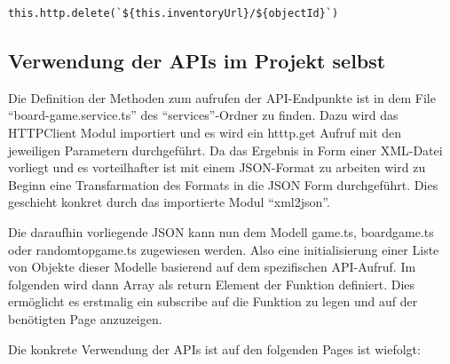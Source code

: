 \begin{center}
    \begin{lstlisting}[caption={Löschaufruf der MongoDB API}, label=lst:jscode]
    this.http.delete(`${this.inventoryUrl}/${objectId}`)
\end{lstlisting}
\end{center}


\subsection{Verwendung der APIs im Projekt selbst}

Die Definition der Methoden zum aufrufen der API-Endpunkte ist in dem   File ``board-game.service.ts'' des ``services''-Ordner zu finden.
Dazu wird das HTTPClient Modul importiert und es wird ein htttp.get Aufruf mit den jeweiligen Parametern durchgeführt. Da das Ergebnis in Form einer XML-Datei vorliegt und es vorteilhafter ist mit einem JSON-Format zu arbeiten wird zu Beginn eine Transfarmation des Formats in die JSON Form durchgeführt.
Dies geschieht konkret durch das importierte Modul ``xml2json''. \bigskip 

Die daraufhin vorliegende JSON kann nun dem Modell game.ts, boardgame.ts oder randomtopgame.ts zugewiesen werden. Also eine initialisierung einer Liste von Objekte dieser Modelle basierend auf dem spezifischen API-Aufruf.
Im folgenden wird dann Array als return Element der Funktion definiert. Dies ermöglicht es erstmalig ein subscribe auf die Funktion zu legen und auf der benötigten Page anzuzeigen. \bigskip 

Die konkrete Verwendung der APIs ist auf den folgenden Pages ist wiefolgt:

